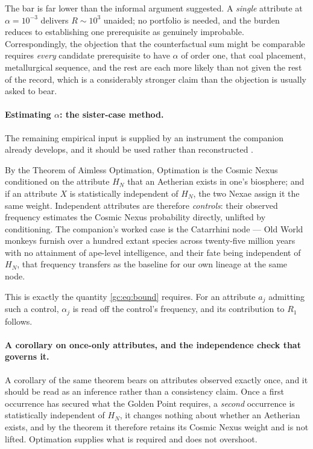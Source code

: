 \noindent The bar is far lower than the informal argument suggested. A
\emph{single} attribute at $\alpha=10^{-3}$ delivers $R\sim10^{3}$
unaided; no portfolio is needed, and the burden reduces to establishing
one prerequisite as genuinely improbable. Correspondingly, the objection
that the counterfactual sum might be comparable requires \emph{every}
candidate prerequisite to have $\alpha$ of order one, that coal
placement, metallurgical sequence, and the rest are each more likely
than not given the rest of the record, which is a considerably
stronger claim than the objection is usually asked to bear.

\paragraph{Estimating $\alpha$: the sister-case method.} The remaining
empirical input is supplied by an instrument the companion already
develops, and it should be used rather than reconstructed
\cite{Nexus}.

By the Theorem of Aimless Optimation, Optimation is the Cosmic Nexus
conditioned on the attribute $H_N$ that an Aetherian exists in one's
biosphere; and if an attribute $X$ is statistically independent of
$H_N$, the two Nexae assign it the same weight. Independent attributes
are therefore \emph{controls}: their observed frequency estimates the
Cosmic Nexus probability directly, unlifted by conditioning. The
companion's worked case is the Catarrhini node --- Old World monkeys
furnish over a hundred extant species across twenty-five million years
with no attainment of ape-level intelligence, and their fate being
independent of $H_N$, that frequency transfers as the baseline for our
own lineage at the same node.

This is exactly the quantity \eqref{gc:eq:bound} requires. For an
attribute $a_j$ admitting such a control, $\alpha_j$ is read off the
control's frequency, and its contribution to $R_1$ follows.

\paragraph{A corollary on once-only attributes, and the independence
check that governs it.}\label{gc:rem:onceonly}
A corollary of the same theorem bears on attributes observed exactly
once, and it should be read as an inference rather than a
consistency claim. Once a first occurrence has secured what the Golden
Point requires, a \emph{second} occurrence is statistically independent
of $H_N$, it changes nothing about whether an Aetherian exists, and by the theorem it therefore retains its Cosmic Nexus weight and is
not lifted. Optimation supplies what is required and does not
overshoot.

